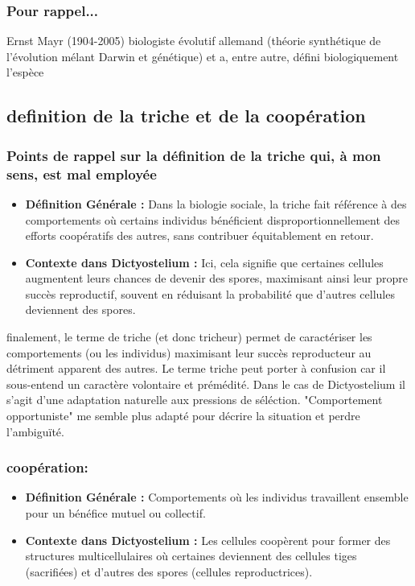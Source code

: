 \documentclass[twocolumn,10pt]{article} %
\begin{document}
               \subsubsection{Pour rappel...}
               Ernst Mayr (1904-2005) biologiste évolutif allemand (théorie synthétique de l'évolution mélant Darwin et génétique) et a, entre autre, défini biologiquement l'espèce
   
    \subsection{definition de la triche et de la coopération}
                \subsubsection{Points de rappel sur la définition de la triche qui, à mon sens, est mal employée}
                    \begin{itemize}
                        \item \textbf{Définition Générale :} Dans la biologie sociale, la triche fait référence à des comportements où certains individus
                        bénéficient disproportionnellement des efforts coopératifs des autres, sans contribuer équitablement en retour.
                        \item \textbf{Contexte dans Dictyostelium :} Ici, cela signifie que certaines cellules augmentent leurs chances de devenir des
                        spores, maximisant ainsi leur propre succès reproductif, souvent en réduisant la probabilité que d'autres
                        cellules deviennent des spores.
                    \end{itemize}

                    finalement, le terme de triche (et donc tricheur) permet de caractériser les comportements (ou les individus) maximisant
                    leur succès reproducteur au détriment apparent des autres. Le terme triche peut porter à confusion car il sous-entend un caractère
                    volontaire et prémédité. Dans le cas de Dictyostelium il s'agit d'une adaptation naturelle aux pressions de séléction. 
                    "Comportement opportuniste" me semble plus adapté pour décrire la situation et perdre l'ambiguïté. 

                \subsubsection{coopération:}
                    \begin{itemize}
                        \item \textbf{Définition Générale :} Comportements où les individus travaillent ensemble pour un bénéfice mutuel ou collectif.
                        \item \textbf{Contexte dans Dictyostelium :} Les cellules coopèrent pour former des structures multicellulaires où certaines 
                        deviennent des cellules tiges (sacrifiées) et d'autres des spores (cellules reproductrices).
                    \end{itemize}



\end{document}
